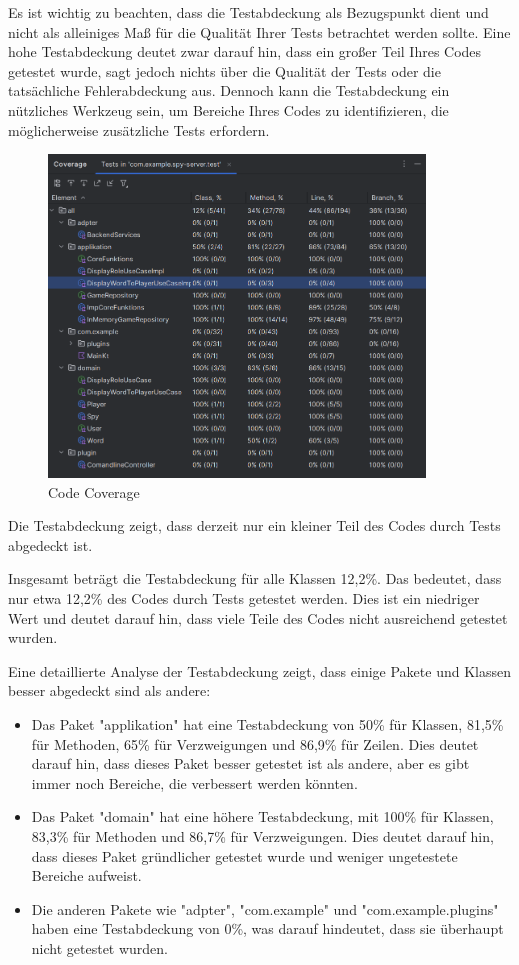 Es ist wichtig zu beachten, dass die Testabdeckung als Bezugspunkt dient und nicht als alleiniges Maß für die Qualität Ihrer Tests betrachtet werden sollte. Eine hohe Testabdeckung deutet zwar darauf hin, dass ein großer Teil Ihres Codes getestet wurde, sagt jedoch nichts über die Qualität der Tests oder die tatsächliche Fehlerabdeckung aus. Dennoch kann die Testabdeckung ein nützliches Werkzeug sein, um Bereiche Ihres Codes zu identifizieren, die möglicherweise zusätzliche Tests erfordern.
\begin{figure}[h]
    \centering
    \includegraphics[width=10cm]{images/image.png}
    \caption{Code Coverage}
    \label{fig:12}
\end{figure}
Die Testabdeckung zeigt, dass derzeit nur ein kleiner Teil des Codes durch Tests abgedeckt ist.

Insgesamt beträgt die Testabdeckung für alle Klassen 12,2\%. Das bedeutet, dass nur etwa 12,2\% des Codes durch Tests getestet werden. Dies ist ein niedriger Wert und deutet darauf hin, dass viele Teile des Codes nicht ausreichend getestet wurden.

Eine detaillierte Analyse der Testabdeckung zeigt, dass einige Pakete und Klassen besser abgedeckt sind als andere:

\begin{itemize}
    \item Das Paket "applikation" hat eine Testabdeckung von 50\% für Klassen, 81,5\% für Methoden, 65\% für Verzweigungen und 86,9\% für Zeilen. Dies deutet darauf hin, dass dieses Paket besser getestet ist als andere, aber es gibt immer noch Bereiche, die verbessert werden könnten.
    
    \item Das Paket "domain" hat eine höhere Testabdeckung, mit 100\% für Klassen, 83,3\% für Methoden und 86,7\% für Verzweigungen. Dies deutet darauf hin, dass dieses Paket gründlicher getestet wurde und weniger ungetestete Bereiche aufweist.
    
    \item Die anderen Pakete wie "adpter", "com.example" und "com.example.plugins" haben eine Testabdeckung von 0\%, was darauf hindeutet, dass sie überhaupt nicht getestet wurden.
\end{itemize}

